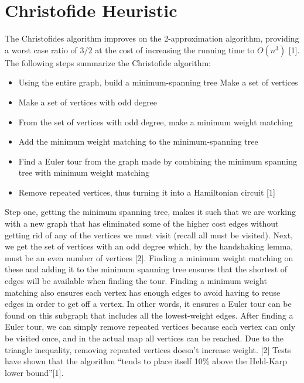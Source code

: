 \documentclass{article}
\begin{document}
\section{Christofide Heuristic}

The Christofides algorithm improves on the 2-approximation algorithm, providing
a worst case ratio of $3/2$ at the cost of increasing the running time to
$O(n^3)$ [1].\\

The following steps summarize the Christofide algorithm:
\begin{itemize}
  \item Using the entire graph, build a minimum-spanning tree Make a set of
        vertices
  \item Make a set of vertices with odd degree
  \item From the set of vertices with odd degree, make a minimum weight matching
  \item Add the minimum weight matching to the minimum-spanning tree
  \item Find a Euler tour from the graph made by combining the minimum spanning
        tree with minimum weight matching
  \item Remove repeated vertices, thus turning it into a Hamiltonian circuit [1]
\end{itemize}

Step one, getting the minimum spanning tree, makes it such that we are working
with a new graph that has eliminated some of the higher cost edges without
getting rid of any of the vertices we must visit (recall all must be visited).
Next, we get the set of vertices with an odd degree which, by the handshaking
lemma, must be an even number of vertices [2]. Finding a minimum weight matching
on these and adding it to the minimum spanning tree ensures that the shortest
of edges will be available when finding the tour. Finding a minimum weight
matching also ensures each vertex has enough edges to avoid having to reuse
edges in order to get off a vertex. In other words, it ensures a Euler tour
can be found on this subgraph that includes all the lowest-weight edges. After
finding a Euler tour, we can simply remove repeated vertices because each vertex
can only be visited once, and in the actual map all vertices can be reached. Due
to the triangle inequality, removing repeated vertices doesn’t increase weight.
[2] Tests have shown that the algorithm “tends to place itself 10\% above the
Held-Karp lower bound”[1].\\
\end{document}

